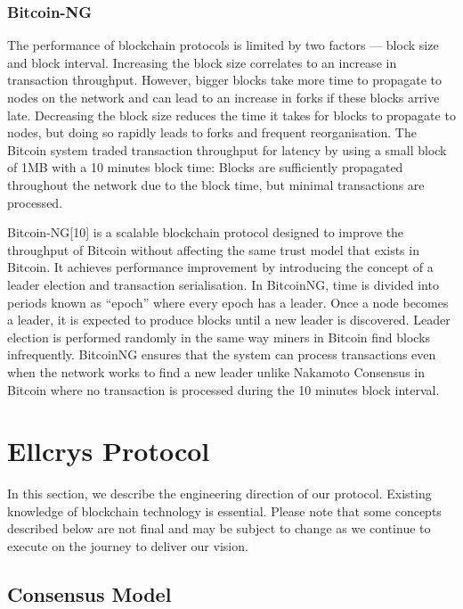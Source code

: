 \subsubsection{Bitcoin-NG}
The performance of blockchain protocols is limited by two factors — block size and block interval. Increasing the block size correlates to an increase in transaction throughput. However, bigger blocks take more time to propagate to nodes on the network and can lead to an increase in forks if these blocks arrive late. Decreasing the block size reduces the time it takes for blocks to propagate to nodes, but doing so rapidly leads to forks and frequent reorganisation. The Bitcoin system traded transaction throughput for latency by using a small block of 1MB with a 10 minutes block time: Blocks are sufficiently propagated throughout the network due to the block time, but minimal transactions are processed.

Bitcoin-NG[10] is a scalable blockchain protocol designed to improve the throughput of Bitcoin without affecting the same trust model that exists in Bitcoin. It achieves performance improvement by introducing the concept of a leader election and transaction serialisation. In BitcoinNG, time is divided into periods known as “epoch” where every epoch has a leader. Once a node becomes a leader, it is expected to produce blocks until a new leader is discovered. Leader election is performed randomly in the same way miners in Bitcoin find blocks infrequently. BitcoinNG ensures that the system can process transactions even when the network works to find a new leader unlike Nakamoto Consensus in Bitcoin where no transaction is processed during the 10 minutes block interval.

\section{Ellcrys Protocol}
In this section, we describe the engineering direction of our protocol. Existing knowledge of blockchain technology is essential. Please note that some concepts described below are not final and may be subject to change as we continue to execute on the journey to deliver our vision.

\subsection{Consensus Model}
